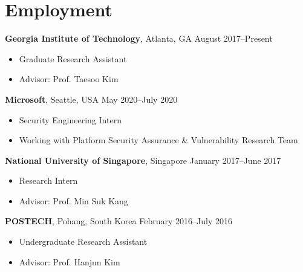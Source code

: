 \section*{Employment}

\begin{description}
\item {\bf Georgia Institute of Technology}, Atlanta, GA \dotfill August 2017--Present
  \begin{itemize}
      \item Graduate Research Assistant
  \item Advisor: Prof. Taesoo Kim
  \end{itemize}

\item {\bf Microsoft}, Seattle, USA \dotfill May 2020--July 2020
  \begin{itemize}
      \item Security Engineering Intern
      \item Working with Platform Security Assurance \& Vulnerability Research Team
  \end{itemize}

  
\item {\bf National University of Singapore}, Singapore \dotfill January 2017--June 2017
  \begin{itemize}
  \item Research Intern
  \item Advisor: Prof. Min Suk Kang
  \end{itemize}

\item {\bf POSTECH}, Pohang, South Korea \dotfill February 2016--July 2016
  \begin{itemize}
  \item Undergraduate Research Assistant
  \item Advisor: Prof. Hanjun Kim
  \end{itemize}
\end{description}

